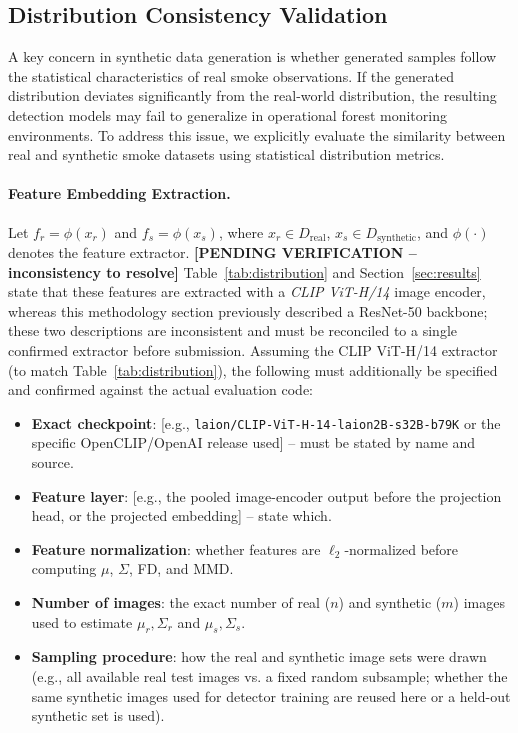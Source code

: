 \documentclass[journal]{IEEEtran}
\begin{document}
\subsection{Distribution Consistency Validation}
\label{sec:distribution_protocol}

A key concern in synthetic data generation is whether generated samples
follow the statistical characteristics of real smoke observations. If the
generated distribution deviates significantly from the real-world
distribution, the resulting detection models may fail to generalize in
operational forest monitoring environments. To address this issue, we
explicitly evaluate the similarity between real and synthetic smoke
datasets using statistical distribution metrics.

\paragraph{Feature Embedding Extraction.}
Let $f_r=\phi(x_r)$ and $f_s=\phi(x_s)$, where $x_r\in D_{\mathrm{real}}$,
$x_s\in D_{\mathrm{synthetic}}$, and $\phi(\cdot)$ denotes the feature
extractor. \textbf{[PENDING VERIFICATION -- inconsistency to resolve]}
Table~\ref{tab:distribution} and Section~\ref{sec:results} state that
these features are extracted with a \emph{CLIP ViT-H/14} image encoder,
whereas this methodology section previously described a ResNet-50
backbone; these two descriptions are inconsistent and must be reconciled
to a single confirmed extractor before submission. Assuming the
CLIP ViT-H/14 extractor (to match Table~\ref{tab:distribution}), the
following must additionally be specified and confirmed against the actual
evaluation code:
\begin{itemize}
    \item \textbf{Exact checkpoint}: [e.g., \texttt{laion/CLIP-ViT-H-14-laion2B-s32B-b79K}
    or the specific OpenCLIP/OpenAI release used] -- must be stated by
    name and source.
    \item \textbf{Feature layer}: [e.g., the pooled image-encoder output
    before the projection head, or the projected embedding] -- state which.
    \item \textbf{Feature normalization}: whether features are
    $\ell_2$-normalized before computing $\mu$, $\Sigma$, FD, and MMD.
    \item \textbf{Number of images}: the exact number of real ($n$) and
    synthetic ($m$) images used to estimate $\mu_r,\Sigma_r$ and
    $\mu_s,\Sigma_s$.
    \item \textbf{Sampling procedure}: how the real and synthetic image
    sets were drawn (e.g., all available real test images vs. a fixed
    random subsample; whether the same synthetic images used for detector
    training are reused here or a held-out synthetic set is used).
\end{itemize}
\end{document}
